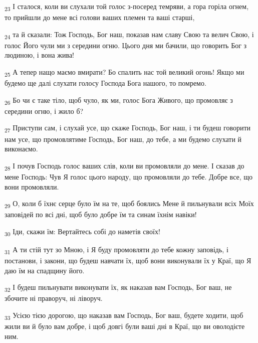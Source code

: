 \begin{tcolorbox}
\textsubscript{23} І сталося, коли ви слухали той голос з-посеред темряви, а гора горіла огнем, то прийшли до мене всі голови ваших племен та ваші старші,
\end{tcolorbox}
\begin{tcolorbox}
\textsubscript{24} та й сказали: Тож Господь, Бог наш, показав нам славу Свою та велич Свою, і голос Його чули ми з середини огню. Цього дня ми бачили, що говорить Бог з людиною, і вона жива!
\end{tcolorbox}
\begin{tcolorbox}
\textsubscript{25} А тепер нащо маємо вмирати? Бо спалить нас той великий огонь! Якщо ми будемо ще далі слухати голосу Господа Бога нашого, то помремо.
\end{tcolorbox}
\begin{tcolorbox}
\textsubscript{26} Бо чи є таке тіло, щоб чуло, як ми, голос Бога Живого, що промовляє з середини огню, і жило б?
\end{tcolorbox}
\begin{tcolorbox}
\textsubscript{27} Приступи сам, і слухай усе, що скаже Господь, Бог наш, і ти будеш говорити нам усе, що промовлятиме Господь, Бог наш, до тебе, а ми будемо слухати й виконаємо.
\end{tcolorbox}
\begin{tcolorbox}
\textsubscript{28} І почув Господь голос ваших слів, коли ви промовляли до мене. І сказав до мене Господь: Чув Я голос цього народу, що промовляли до тебе. Добре все, що вони промовляли.
\end{tcolorbox}
\begin{tcolorbox}
\textsubscript{29} О, коли б їхнє серце було їм на те, щоб боялись Мене й пильнували всіх Моїх заповідей по всі дні, щоб було добре їм та синам їхнім навіки!
\end{tcolorbox}
\begin{tcolorbox}
\textsubscript{30} Іди, скажи їм: Вертайтесь собі до наметів своїх!
\end{tcolorbox}
\begin{tcolorbox}
\textsubscript{31} А ти стій тут зо Мною, і Я буду промовляти до тебе кожну заповідь, і постанови, і закони, що будеш навчати їх, щоб вони виконували їх у Краї, що Я даю їм на спадщину його.
\end{tcolorbox}
\begin{tcolorbox}
\textsubscript{32} І будеш пильнувати виконувати їх, як наказав вам Господь, Бог ваш, не збочите ні праворуч, ні ліворуч.
\end{tcolorbox}
\begin{tcolorbox}
\textsubscript{33} Усією тією дорогою, що наказав вам Господь, Бог ваш, будете ходити, щоб жили ви й було вам добре, і щоб довгі були ваші дні в Краї, що ви оволодієте ним.
\end{tcolorbox}
